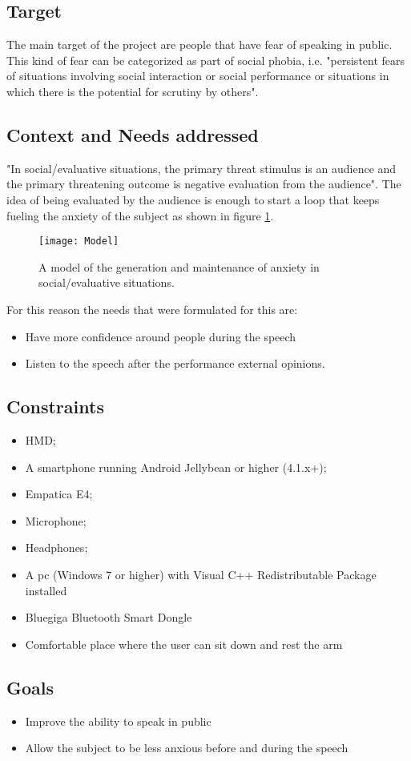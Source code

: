 \subsection{Target}
The main target of the project are people that have fear of speaking in public. This kind of fear can be categorized as part of social phobia, i.e. "persistent fears of situations involving social interaction or social performance or situations in which there is the potential for scrutiny by others"\cite{model}.

\subsection{Context and Needs addressed}
"In social/evaluative situations, the primary threat stimulus is an audience and the primary threatening outcome is negative evaluation from the audience"\cite{model}.
The idea of being evaluated by the audience is enough to start a loop that keeps fueling the anxiety of the subject as shown in figure \ref{fig:model}.
\begin{figure}[!h]
	\centering
	\texttt{[image: Model]}
	\caption{A model of the generation and maintenance of anxiety in social/evaluative situations\cite{model}.}\label{fig:model}
\end{figure}

For this reason the needs that were formulated for this are:
\begin{itemize}
	\item Have more confidence around people during the speech
	\item Listen to the speech after the performance
 external opinions.
\end{itemize}

\subsection{Constraints}
\begin{itemize}
	\item HMD;
	\item A smartphone running Android Jellybean or higher (4.1.x+);
	\item Empatica E4;
	\item Microphone;
	\item Headphones;
	\item A pc (Windows 7 or higher) with Visual C++ Redistributable Package installed
	\item Bluegiga Bluetooth Smart Dongle
	\item Comfortable place where the user can sit down and rest the arm
\end{itemize}

\subsection{Goals}
\begin{itemize}
	\item Improve the ability to speak in public
	\item Allow the subject to be less anxious before and during the speech
\end{itemize}



